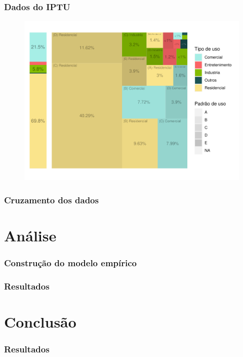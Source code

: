 \documentclass[aspectratio=169]{beamer}
\begin{document}
\begin{frame}
    \frametitle{Dados do IPTU}
    \begin{figure}
        \centering
        \includegraphics[height = .95\textheight]{imagens/tree_area_construida.pdf}
    \end{figure}
\end{frame}

\begin{frame}
    \frametitle{Cruzamento dos dados}
\end{frame}

\section{Análise}

\begin{frame}
    \frametitle{Construção do modelo empírico}
\end{frame}

\begin{frame}
    \frametitle{Resultados}
\end{frame}

\section{Conclusão}

\begin{frame}
    \frametitle{Resultados}
\end{frame}

\end{document}
